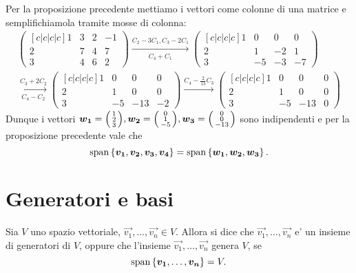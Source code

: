 \begin{solution}
    Per la proposizione precedente mettiamo i vettori come colonne di una matrice e semplifichiamola tramite mosse di colonna:
    \begin{gather*}
        \begin{pmatrix}[c|c|c|c]
            1 & 3 & 2 & -1 \\ 2 & 7 & 4 & 7 \\ 3 & 4 & 6 & 2
        \end{pmatrix} \xrightarrow[C_4 + C_1]{C_2 - 3C_1, C_3 - 2C_1} \begin{pmatrix}
            [c|c|c|c]
            1 & 0 & 0 & 0 \\ 2 & 1 & -2 & 1 \\ 3 & -5 & -3 & -7
        \end{pmatrix} \\ 
        \xrightarrow[C_4 - C_2]{C_3 + 2C_2} \begin{pmatrix}
            [c|c|c|c]
            1 & 0 & 0 & 0 \\ 2 & 1 & 0 & 0 \\ 3 & -5 & -13 & -2
        \end{pmatrix} \xrightarrow[]{C_4 - \frac{2}{13}C_3} \begin{pmatrix}
            [c|c|c|c]
            1 & 0 & 0 & 0 \\ 2 & 1 & 0 & 0 \\ 3 & -5 & -13 & 0
        \end{pmatrix}
    \end{gather*}
    Dunque i vettori $\vec{w_1} = \begin{psmallmatrix} 1 \\ 2 \\ 3 \end{psmallmatrix}, \vec{w_2} = \begin{psmallmatrix} 0 \\ 1 \\ -5 \end{psmallmatrix}, \vec{w_3} = \begin{psmallmatrix} 0 \\ 0 \\ -13 \end{psmallmatrix}$ sono indipendenti e per la proposizione precedente vale che \[
        \Span{\vec{v_1}, \vec{v_2}, \vec{v_3}, \vec{v_4}} = \Span{\vec{w_1}, \vec{w_2}, \vec{w_3}}.
    \]
\end{solution}

\section{Generatori e basi}
\begin{definition}
    Sia $V$ uno spazio vettoriale, $\vec{v_1}, \dots, \vec{v_n} \in V$. Allora si dice che ${\vec{v_1}, \dots, \vec{v_n}}$ e' un insieme di generatori di $V$, oppure che l'insieme ${\vec{v_1}, \dots, \vec{v_n}}$ genera $V$, se
    \begin{equation}
        \Span{\vec{v_1}, \dots, \vec{v_n}} = V.
    \end{equation}
\end{definition}

